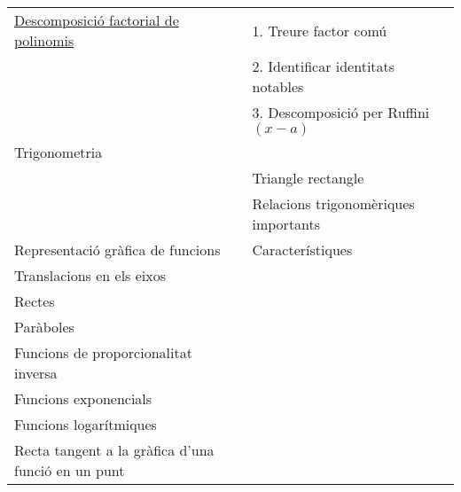 \documentclass{article}
\begin{document}
\begin{center}
\begin{tabular}{ | l |l|l|}
            \hline

    \href{http://proyectodescartes.org/EDAD/materiales_didacticos/EDAD_4eso_cat_polinomios-JS-LOMCE/index.htm}{Descomposició factorial de polinomis}& 1. Treure factor comú & \\
    & 2. Identificar identitats notables & \\
    & 3. Descomposició per Ruffini $(x-a)$ & \\
    \hline
    Trigonometria& & \\
    \hline
    &Triangle rectangle& \\
    &Relacions trigonomèriques importants& \\
    \hline
    Representació gràfica de funcions & Característiques & \\
    \hline
    Translacions en els eixos& & \\
    \hline
    Rectes& & \\
    \hline
    Paràboles& & \\
    \hline
    Funcions de proporcionalitat inversa& & \\
    \hline
    Funcions exponencials& & \\
    \hline
    Funcions logarítmiques& & \\
        \hline
    Recta tangent a la gràfica d'una funció en un punt& & \\
\hline
	\end{tabular}
\end{center}
\end{document}
